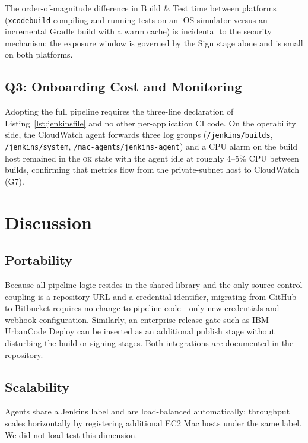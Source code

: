 \documentclass[conference]{IEEEtran}
\begin{document}
The order-of-magnitude difference in Build \& Test time between platforms
(\texttt{xcodebuild} compiling and running tests on an iOS simulator versus an
incremental Gradle build with a warm cache) is incidental to the security
mechanism; the exposure window is governed by the Sign stage alone and is small
on both platforms.

\subsection{Q3: Onboarding Cost and Monitoring}
Adopting the full pipeline requires the three-line declaration of
Listing~\ref{lst:jenkinsfile} and no other per-application CI code. On the
operability side, the CloudWatch agent forwards three log groups
(\texttt{/jenkins/builds}, \texttt{/jenkins/system},
\texttt{/mac-agents/jenkins-agent}) and a CPU alarm on the build host remained in
the \textsc{ok} state with the agent idle at roughly 4--5\% CPU between builds,
confirming that metrics flow from the private-subnet host to CloudWatch (G7).

\section{Discussion}\label{sec:discuss}
\subsection{Portability}
Because all pipeline logic resides in the shared library and the only
source-control coupling is a repository URL and a credential identifier,
migrating from GitHub to Bitbucket requires no change to pipeline code---only new
credentials and webhook configuration. Similarly, an enterprise release gate such
as IBM UrbanCode Deploy can be inserted as an additional publish stage without
disturbing the build or signing stages. Both integrations are documented in the
repository.

\subsection{Scalability}
Agents share a Jenkins label and are load-balanced automatically; throughput
scales horizontally by registering additional EC2 Mac hosts under the same label.
We did not load-test this dimension.
\end{document}

